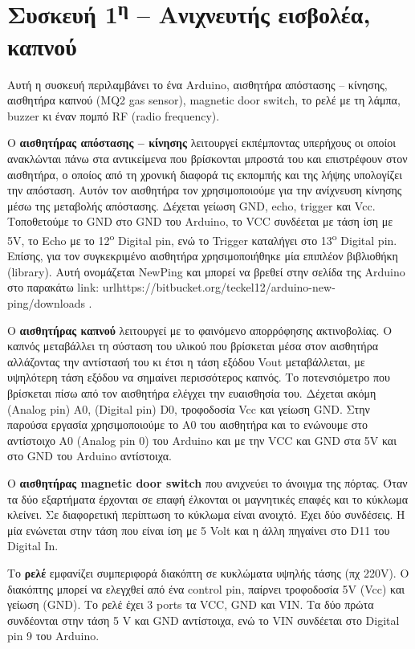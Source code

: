 \documentclass[twoside,a4paper]{article}
\begin{document}
 \section{Συσκευή 1\textsuperscript{η} – Ανιχνευτής εισβολέα, καπνού}
 \setlength{\parskip}{0.6em}
 \begin{flushleft}
 Αυτή η συσκευή περιλαμβάνει το ένα Arduino, αισθητήρα απόστασης – κίνησης, αισθητήρα καπνού (MQ2 gas sensor), magnetic door switch, το ρελέ με τη λάμπα, buzzer κι έναν πομπό RF (radio frequency).
 \par
 Ο \textbf{αισθητήρας απόστασης – κίνησης}  λειτουργεί εκπέμποντας υπερήχους οι οποίοι ανακλώνται πάνω στα αντικείμενα που βρίσκονται μπροστά του και επιστρέφουν στον αισθητήρα, ο οποίος από τη χρονική διαφορά τις εκπομπής και της λήψης υπολογίζει την απόσταση. Αυτόν τον αισθητήρα τον χρησιμοποιούμε για την ανίχνευση κίνησης μέσω της μεταβολής απόστασης. Δέχεται γείωση GND, echo, trigger και Vcc. Τοποθετούμε το GND στο GND του Arduino, το VCC συνδέεται με τάση ίση με 5V, το Echo με το 12\textsuperscript{o} Digital pin, ενώ το Trigger καταλήγει στο 13\textsuperscript{o} Digital pin. Επίσης, για τον συγκεκριμένο αισθητήρα χρησιμοποιήθηκε μία επιπλέον βιβλιοθήκη (library). Αυτή ονομάζεται NewPing και μπορεί να βρεθεί στην σελίδα της Arduino στο παρακάτω link: url{https://bitbucket.org/teckel12/arduino-new-ping/downloads} .
\par
Ο \textbf{αισθητήρας καπνού} λειτουργεί με το φαινόμενο απορρόφησης ακτινοβολίας. Ο καπνός μεταβάλλει τη σύσταση του υλικού που βρίσκεται μέσα στον αισθητήρα αλλάζοντας την αντίστασή του κι έτσι η τάση εξόδου Vout μεταβάλλεται, με υψηλότερη τάση εξόδου να σημαίνει περισσότερος καπνός. Το ποτενσιόμετρο που βρίσκεται πίσω από τον αισθητήρα ελέγχει την ευαισθησία του. Δέχεται ακόμη (Analog pin) A0, (Digital pin) D0, τροφοδοσία Vcc και γείωση GND. Στην παρούσα εργασία χρησιμοποιούμε το A0 του αισθητήρα και το ενώνουμε στο αντίστοιχο A0 (Analog pin 0) του Arduino και με την VCC και GND στα 5V και στο GND του Arduino αντίστοιχα.
\par 
Ο \textbf{αισθητήρας magnetic door switch} που ανιχνεύει το άνοιγμα της πόρτας. Όταν τα δύο εξαρτήματα έρχονται σε επαφή έλκονται οι μαγνητικές επαφές και το κύκλωμα κλείνει. Σε διαφορετική περίπτωση το κύκλωμα είναι ανοιχτό. Έχει δύο συνδέσεις. Η μία ενώνεται στην τάση που είναι ίση με 5 Volt και η άλλη πηγαίνει στο D11 του Digital In.
\par 
Το \textbf{ρελέ} εμφανίζει συμπεριφορά διακόπτη σε κυκλώματα υψηλής τάσης (πχ 220V). O διακόπτης μπορεί να ελεγχθεί από ένα control pin, παίρνει τροφοδοσία 5V (Vcc) και γείωση (GND). Το ρελέ έχει 3 ports τα VCC, GND  και  VIN. Τα δύο πρώτα συνδέονται στην τάση 5 V και GND αντίστοιχα, ενώ το VIN συνδέεται στο Digital pin 9 του Arduino.

\end{flushleft}
\end{document}
